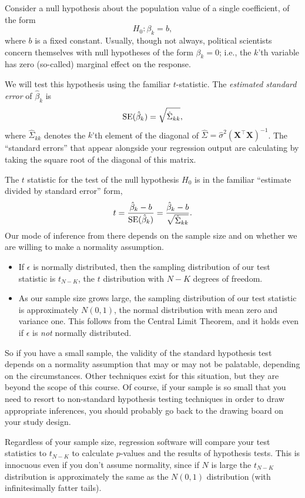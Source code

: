 \documentclass[
  12pt,
  oneside,openany]{book}
\begin{document}
Consider a null hypothesis about the population value of a single coefficient, of the form
\[
H_0 : \beta_k = b,
\]
where \(b\) is a fixed constant. Usually, though not always, political scientists concern themselves with null hypotheses of the form \(\beta_k = 0\); i.e., the \(k\)'th variable has zero (so-called) marginal effect on the response.

We will test this hypothesis using the familiar \(t\)-statistic. The \emph{estimated standard error} of \(\hat{\beta}_k\) is
\[
\mathop{\rm SE}\nolimits(\hat{\beta}_k) = \sqrt{\hat{\Sigma}_{kk}},
\]
where \(\hat{\Sigma}_{kk}\) denotes the \(k\)'th element of the diagonal of \(\hat{\Sigma} = \hat{\sigma}^2 (\mathbf{X}^\top \mathbf{X})^{-1}\). The ``standard errors'' that appear alongside your regression output are calculating by taking the square root of the diagonal of this matrix.

The \(t\) statistic for the test of the null hypothesis \(H_0\) is in the familiar ``estimate divided by standard error'' form,
\[
t = \frac{\hat{\beta}_k - b}{\mathop{\rm SE}\nolimits(\hat{\beta}_k)} = \frac{\hat{\beta}_k - b}{\sqrt{\hat{\Sigma}_{kk}}}.
\]
Our mode of inference from there depends on the sample size and on whether we are willing to make a normality assumption.

\begin{itemize}
\item
  If \(\epsilon\) is normally distributed, then the sampling distribution of our test statistic is \(t_{N - K}\), the \(t\) distribution with \(N - K\) degrees of freedom.
\item
  As our sample size grows large, the sampling distribution of our test statistic is approximately \(N(0, 1)\), the normal distribution with mean zero and variance one. This follows from the Central Limit Theorem, and it holds even if \(\epsilon\) is \emph{not} normally distributed.
\end{itemize}

So if you have a small sample, the validity of the standard hypothesis test depends on a normality assumption that may or may not be palatable, depending on the circumstances. Other techniques exist for this situation, but they are beyond the scope of this course. Of course, if your sample is so small that you need to resort to non-standard hypothesis testing techniques in order to draw appropriate inferences, you should probably go back to the drawing board on your study design.

Regardless of your sample size, regression software will compare your test statistics to \(t_{N - K}\) to calculate \(p\)-values and the results of hypothesis tests. This is innocuous even if you don't assume normality, since if \(N\) is large the \(t_{N - K}\) distribution is approximately the same as the \(N(0, 1)\) distribution (with infinitesimally fatter tails).
\end{document}
